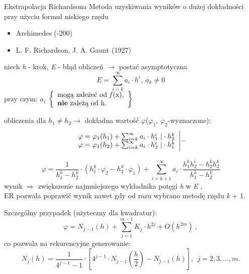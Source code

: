 	\begin{frame}{Ekstrapolacja Richardsona}
		Metoda uzyskiwania wyników o dużej dokładności przy użyciu formuł niskiego rzędu	
       
        \begin{itemize}
          \item Archimedes (-200)
          \item L. F. Richardson, J. A. Gaunt (1927)
        \end{itemize}
        niech	\textit{h} - krok, \textit{E} - błąd obliczeń $\rightarrow$ postać asymptotyczna
        $$
			E=\sum_{i=k}^{\infty}a_{i}\cdot h^{i},\ a_{k}\neq 0
		$$
		przy czym: $a_{i}$
         $\left\{\begin{array}{l}
  			\textnormal{mogą zależeć od \textit{f}(x),}\\
            \textnormal{\textbf{nie} zależą od h.}
        \end{array}\right\}$
   \end{frame}
   \begin{frame}
   
   obliczenia dla $h_{1}\neq h_{2}\rightarrow$ dokładna wartość $\varphi$($\varphi_{1}$, $\varphi_{2}$-wyznaczone):
		$$
        \begin{array}{l}
\varphi=\varphi_{1}(h_{1})+\sum_{i=k}^{\infty}{a_{i}}\cdot h_{1}^{i}\ \text{\textbar}\cdot h_{2}^{k}\\
\varphi=\varphi_{1}(h_{2})+\sum_{i=k}^{\infty}{a_{i}}\cdot h_{2}^{i}\ \text{\textbar}\cdot h_{1}^{k}
		\end{array}\Bigg\lvert -
        $$
        
		$$
\varphi=\frac{1}{h_{1}^{k}-h_{2}^{k}}\cdot(h_{1}^{k}\cdot\varphi_{2}-h_{2}^{k}\cdot\varphi_{1})+\sum_{i=k+1}^{\infty}a_{i}\cdot\frac{h_{1}^{k}h_{2}^{i}-h_{2}^{k}h_{2}^{k}}{h_{1}^{k}-h_{2}^{k}}
		$$
		wynik $\Rightarrow$ zwiększenie najmniejszego wykładnika potęgi \textit{h} w \textit{E} , \\
		ER pozwala poprawić wynik nawet gdy od razu wybrano metodę rzędu \textit{k} + 1.        
	\end{frame}
	\begin{frame}
		Szczególny przypadek (użyteczny dla kwadratur):
		$$
\varphi=N_{j-1}(h)+\sum_{j=1}^{m-1}K_{j}\cdot h^{2j}+O(h^{2m})\ ,
        $$
        co pozwala na rekurencyjne generowanie:   
        $$
N_{j}(h)=\displaystyle \frac{1}{4^{j-1}-1}\cdot[4^{j-1}\cdot N_{j-1}(\frac{h}{2})-N_{j-1}(h)],\ \ j=2, 3, . . ., m.
		$$
    \end{frame}




